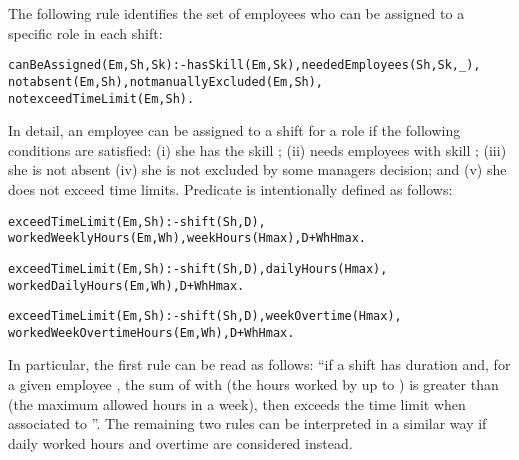 \documentclass{tlp}
\begin{document}
The following rule identifies
the set of employees who can be assigned to a specific role in each shift:
\begin{alltt}\small
 canBeAssigned(Em,Sh,Sk) :- hasSkill(Em,Sk), neededEmployees(Sh,Sk,_),
    not absent(Em,Sh), not manuallyExcluded(Em,Sh),
    not exceedTimeLimit(Em,Sh).
\end{alltt}\normalsize
In detail, an employee  can be assigned to a shift  for a role 
if the following conditions are satisfied:
(i) she has the skill ;
(ii)  needs employees with skill ;
(iii) she is not absent
(iv) she is not excluded by some managers decision; and
(v) she does not exceed time limits.
Predicate  is intentionally defined as follows:

\begin{alltt}\small
 exceedTimeLimit(Em,Sh) :- shift(Sh,D),
    workedWeeklyHours(Em,Wh), weekHours(Hmax), D + Wh   Hmax.

 exceedTimeLimit(Em,Sh) :- shift(Sh,D), dailyHours(Hmax),
    workedDailyHours(Em,Wh), D + Wh   Hmax.

 exceedTimeLimit(Em,Sh) :- shift(Sh,D), weekOvertime(Hmax),
    workedWeekOvertimeHours(Em,Wh), D + Wh   Hmax.
\end{alltt}\normalsize
In particular, the first rule can be read as follows:
``if a shift  has duration 
and, for a given employee , the sum of  with  (the hours worked by  up to )
is greater than  (the maximum allowed hours in a week),
then  exceeds the time limit when associated to ''.
The remaining two rules can be interpreted in a similar way if daily worked hours and overtime are
considered instead.
\end{document}
